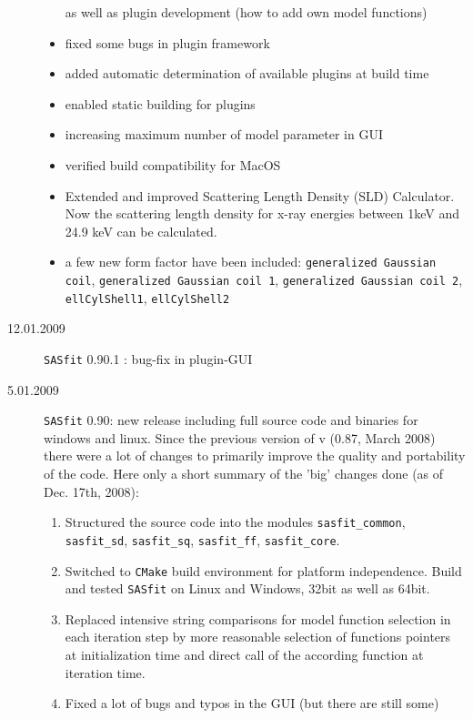 \begin{description}
\begin{itemize}
                  as well as plugin development (how to add own model functions)
            \item fixed some bugs in plugin framework
            \item added automatic determination of available plugins at build time
            \item enabled static building for plugins
            \item increasing maximum number of model parameter in GUI
            \item verified build compatibility for MacOS
            \item Extended and improved Scattering Length Density (SLD) Calculator.
                  Now the scattering length density for x-ray energies between 1keV
                  and 24.9 keV can be calculated.
            \item a few new form factor have been included:
                        \texttt{generalized Gaussian coil},
                        \texttt{generalized Gaussian coil 1},
                        \texttt{generalized Gaussian coil 2},
                        \texttt{ellCylShell1},
                        \texttt{ellCylShell2}
        \end{itemize}
    \item[12.01.2009]{\tt SASfit} 0.90.1 : bug-fix in plugin-GUI
    \item[5.01.2009] {\tt SASfit} 0.90:
    new release including full source code and binaries for
    windows and linux. Since the previous version of v (0.87, March 2008)
    there were a lot of changes to primarily improve the quality
    and portability of the code. Here only a short summary of the 'big'
    changes done (as of Dec. 17th, 2008):
    \begin{enumerate}
        \item Structured the source code into the modules \texttt{sasfit\_common}, \texttt{sasfit\_sd}, \texttt{sasfit\_sq},
                \texttt{sasfit\_ff}, \texttt{sasfit\_core}.
        \item Switched to {\tt CMake} build environment for platform independence. Build and tested {\tt SASfit} on
                Linux and Windows, 32bit as well as 64bit.
        \item Replaced intensive string comparisons for model function selection in each iteration step by more reasonable
                selection of functions pointers at initialization time and direct call of the according function at iteration time.
        \item Fixed a lot of bugs and typos in the GUI (but there are still some)

\end{enumerate}
\end{description}
